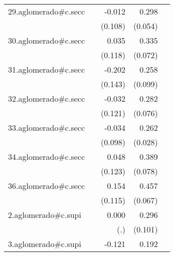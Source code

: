 {\begin{longtable}{l*{4}{D{.}{.}{-1}}}
\addlinespace
29.aglomerado#c.secc&                     &      -0.012         &       0.298\sym{***}&                     \\
            &                     &     (0.108)         &     (0.054)         &                     \\
\addlinespace
30.aglomerado#c.secc&                     &       0.035         &       0.335\sym{***}&                     \\
            &                     &     (0.118)         &     (0.072)         &                     \\
\addlinespace
31.aglomerado#c.secc&                     &      -0.202         &       0.258\sym{**} &                     \\
            &                     &     (0.143)         &     (0.099)         &                     \\
\addlinespace
32.aglomerado#c.secc&                     &      -0.032         &       0.282\sym{***}&                     \\
            &                     &     (0.121)         &     (0.076)         &                     \\
\addlinespace
33.aglomerado#c.secc&                     &      -0.034         &       0.262\sym{***}&                     \\
            &                     &     (0.098)         &     (0.028)         &                     \\
\addlinespace
34.aglomerado#c.secc&                     &       0.048         &       0.389\sym{***}&                     \\
            &                     &     (0.123)         &     (0.078)         &                     \\
\addlinespace
36.aglomerado#c.secc&                     &       0.154         &       0.457\sym{***}&                     \\
            &                     &     (0.115)         &     (0.067)         &                     \\
\addlinespace
2.aglomerado#c.supi&                     &       0.000         &       0.296\sym{**} &                     \\
            &                     &         (.)         &     (0.101)         &                     \\
\addlinespace
3.aglomerado#c.supi&                     &      -0.121         &       0.192\sym{*}  &                     \\

\end{longtable}}
